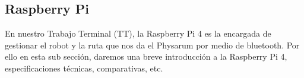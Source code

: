 \subsection{Raspberry Pi} %
\label{sub:Rasbery}
    En nuestro Trabajo Terminal (TT), la Raspberry Pi 4 es la encargada de gestionar el robot y la ruta que nos da el 
        Physarum por medio de bluetooth. Por ello en esta sub secci\'on, daremos una breve introducci\'on a la Raspberry Pi 4,
        especificaciones t\'ecnicas, comparativas, etc.
    \vskip 0.5cm
    
    
    